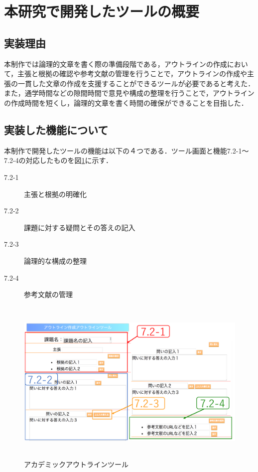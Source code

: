 \documentclass[a4j,12pt]{jarticle}
\begin{document}
\section{本研究で開発したツールの概要}
\subsection{実装理由}
本制作では論理的文章を書く際の準備段階である，アウトラインの作成において，主張と根拠の確認や参考文献の管理を行うことで，アウトラインの作成や主張の一貫した文章の作成を支援することができるツールが必要であると考えた．また，通学時間などの隙間時間で意見や構成の整理を行うことで，アウトラインの作成時間を短くし，論理的文章を書く時間の確保ができることを目指した．

\subsection{実装した機能について}
本制作で開発したツールの機能は以下の４つである．ツール画面と機能7.2-1〜7.2-4の対応したものを図\ref{fig:g}に示す．
\begin{description}
  \item[7.2-1]主張と根拠の明確化
  \item[7.2-2]課題に対する疑問とその答えの記入
  \item[7.2-3]論理的な構成の整理
  \item[7.2-4]参考文献の管理
 \end{description}
\begin{figure}[h]
\begin{center}
 \includegraphics[clip,width=130mm,height=80mm]{figure/pp01.pdf}
\end{center}
 \caption{アカデミックアウトラインツール}
 \label{fig:g}
\end{figure}
\newpage
\end{document}
